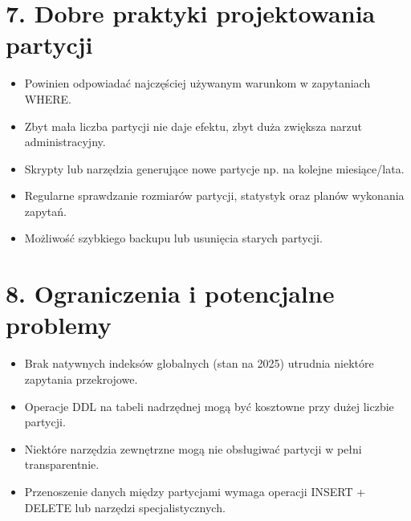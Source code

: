 \documentclass[a4paper,11pt,polish]{sphinxmanual}
\begin{document}
\section{7. Dobre praktyki projektowania partycji}
\label{\detokenize{rozdzial_1:dobre-praktyki-projektowania-partycji}}\begin{itemize}
\item {} 
\sphinxAtStartPar
{} Powinien odpowiadać najczęściej używanym warunkom w zapytaniach WHERE.

\item {} 
\sphinxAtStartPar
{} Zbyt mała liczba partycji nie daje efektu, zbyt duża zwiększa narzut administracyjny.

\item {} 
\sphinxAtStartPar
{} Skrypty lub narzędzia generujące nowe partycje np. na kolejne miesiące/lata.

\item {} 
\sphinxAtStartPar
{} Regularne sprawdzanie rozmiarów partycji, statystyk oraz planów wykonania zapytań.

\item {} 
\sphinxAtStartPar
{} Możliwość szybkiego backupu lub usunięcia starych partycji.

\end{itemize}


\section{8. Ograniczenia i potencjalne problemy}
\label{\detokenize{rozdzial_1:ograniczenia-i-potencjalne-problemy}}\begin{itemize}
\item {} 
\sphinxAtStartPar
Brak natywnych indeksów globalnych (stan na 2025) utrudnia niektóre zapytania przekrojowe.

\item {} 
\sphinxAtStartPar
Operacje DDL na tabeli nadrzędnej mogą być kosztowne przy dużej liczbie partycji.

\item {} 
\sphinxAtStartPar
Niektóre narzędzia zewnętrzne mogą nie obsługiwać partycji w pełni transparentnie.

\item {} 
\sphinxAtStartPar
Przenoszenie danych między partycjami wymaga operacji INSERT + DELETE lub narzędzi specjalistycznych.

\end{itemize}
\end{document}
